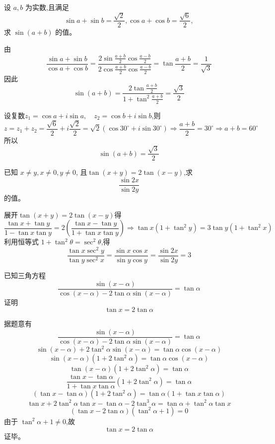 \begin{questions}
    \question 设 $a,b$ 为实数,且满足 
    \[
    \sin a+\sin b=\frac{\sqrt{2}}{2},\cos a+\cos b=\frac{\sqrt{6}}{2},
    \]
    求 $\sin(a+b)$ 的值。
    \begin{solution}
        由
        \[
        \frac{\sin a+\sin b}{\cos a+\cos b}
        =\frac{2\sin\frac{a+b}{2}\cos\frac{a-b}{2}}{2\cos\frac{a+b}{2}\cos\frac{a-b}{2}}
        =\tan\frac{a+b}{2}=\frac{1}{\sqrt{3}}
        \]
        因此
        \[
        \sin(a+b)=\frac{2\tan\frac{a+b}{2}}{1+\tan^2\frac{a+b}{2}}=\frac{\sqrt{3}}{2}
        \]
    \end{solution}
    \begin{solution}
        设复数$z_1=\cos a+i\sin a,\quad z_2=\cos b+i\sin b$,则
        \[
        z=z_1+z_2
        =\frac{\sqrt{6}}{2}+i\frac{\sqrt{2}}{2}
        =\sqrt{2}\left(\cos 30^\circ+i\sin 30^\circ\right)
        \Rightarrow \frac{a+b}{2}=30^\circ \Rightarrow a+b=60^\circ
        \]
        所以
        \[
        \sin(a+b)=\frac{\sqrt{3}}{2}
        \]
    \end{solution}

    \question 已知 $x\neq y,x\neq 0,y\neq 0$, 且$\tan(x+y)=2\tan(x-y)$,求
    \[
    \frac{\sin 2x}{\sin 2y}
    \]
    的值。
    \begin{solution}
        展开$\tan(x+y)=2\tan(x-y)$得
        \[
        \frac{\tan x+\tan y}{1-\tan x\tan y}
        =
        2\left(\frac{\tan x-\tan y}{1+\tan x\tan y}\right)\Rightarrow \tan x(1+\tan^2 y)=3\tan y(1+\tan^2 x)
        \]
        利用恒等式 $1+\tan^2\theta=\sec^2\theta$,得
        \[
        \frac{\tan x\sec^2 y}{\tan y\sec^2 x}=\frac{\sin x\cos x}{\sin y\cos y}=\frac{\sin 2x}{\sin 2y}=3
        \]
    \end{solution}

    \question 已知三角方程
    \[
    \frac{\sin(x-\alpha)}{\cos(x-\alpha)-2\tan\alpha\sin(x-\alpha)}=\tan\alpha
    \]
    证明
    \[
    \tan x=2\tan\alpha
    \]
    \begin{solution}
        据题意有
        \[
        \frac{\sin(x-\alpha)}{\cos(x-\alpha)-2\tan\alpha\sin(x-\alpha)}=\tan\alpha
        \]
        \[
        \sin(x-\alpha)+2\tan^2\alpha\sin(x-\alpha)=\tan\alpha\cos(x-\alpha)
        \]
        \[
        \sin(x-\alpha)\left(1+2\tan^2\alpha\right)=\tan\alpha\cos(x-\alpha)
        \]
        \[
        \tan(x-\alpha)\left(1+2\tan^2\alpha\right)=\tan\alpha
        \]
        \[
        \frac{\tan x-\tan\alpha}{1+\tan x\tan\alpha}\left(1+2\tan^2\alpha\right)=\tan\alpha
        \]
        \[
        (\tan x-\tan\alpha)(1+2\tan^2\alpha)=\tan\alpha(1+\tan x\tan\alpha)
        \]
        \[
        \tan x+2\tan^2\alpha\tan x-\tan\alpha-2\tan^3\alpha
        =\tan\alpha+\tan^2\alpha\tan x
        \]
        \[
        (\tan x-2\tan\alpha)(\tan^2\alpha+1)=0
        \]
        由于 $\tan^2\alpha+1\neq0$,故
        \[
        \tan x=2\tan\alpha
        \]
        证毕。
    \end{solution}


\end{questions}
